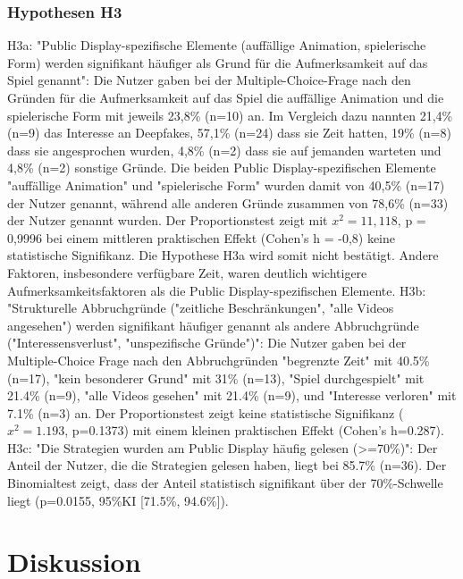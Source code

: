 \subsection{Hypothesen H3}
H3a: "Public Display-spezifische Elemente (auffällige Animation, spielerische Form) werden signifikant häufiger als Grund für die Aufmerksamkeit auf das Spiel genannt": 
Die Nutzer gaben bei der Multiple-Choice-Frage nach den Gründen für die Aufmerksamkeit auf das Spiel die auffällige Animation 
und die spielerische Form mit jeweils 23,8\% (n=10) an. Im Vergleich dazu nannten 21,4\% (n=9) das Interesse an Deepfakes, 57,1\% (n=24) dass sie Zeit hatten, 
19\% (n=8) dass sie angesprochen wurden, 4,8\% (n=2) dass sie auf jemanden warteten und 4,8\% (n=2) sonstige Gründe.
Die beiden Public Display-spezifischen Elemente "auffällige Animation" und "spielerische Form" wurden damit von 40,5\% (n=17) der Nutzer genannt, 
während alle anderen Gründe zusammen von 78,6\% (n=33) der Nutzer genannt wurden. 
Der Proportionstest zeigt mit $x^2=11,118$, p = 0,9996 bei einem mittleren praktischen Effekt (Cohen's h = -0,8) keine statistische Signifikanz. 
Die Hypothese H3a wird somit nicht bestätigt. 
Andere Faktoren, insbesondere verfügbare Zeit, waren deutlich wichtigere Aufmerksamkeitsfaktoren als die Public Display-spezifischen Elemente.
H3b: "Strukturelle Abbruchgründe ("zeitliche Beschränkungen", "alle Videos angesehen") 
werden signifikant häufiger genannt als andere Abbruchgründe ("Interessensverlust", "unspezifische Gründe")": 
Die Nutzer gaben bei der Multiple-Choice Frage nach den Abbruchgründen "begrenzte Zeit" mit 40.5\% (n=17), 
"kein besonderer Grund" mit 31\% (n=13), "Spiel durchgespielt" mit 21.4\% (n=9), "alle Videos gesehen" mit 21.4\% (n=9), und "Interesse verloren" mit 7.1\% (n=3) an. 
Der Proportionstest zeigt keine statistische Signifikanz ($x^2=1.193$, p=0.1373) mit einem kleinen praktischen Effekt (Cohen's h=0.287).
H3c: "Die Strategien wurden am Public Display häufig gelesen (>=70\%)":
Der Anteil der Nutzer, die die Strategien gelesen haben, liegt bei 85.7\% (n=36). 
Der Binomialtest zeigt, dass der Anteil statistisch signifikant über der 70\%-Schwelle liegt (p=0.0155, 95\%KI [71.5\%, 94.6\%]).

\chapter{Diskussion}
